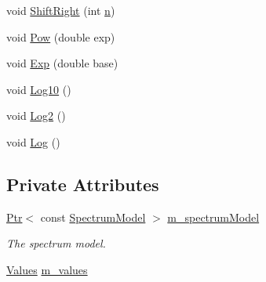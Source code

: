 \begin{DoxyCompactItemize}
\item 
void \hyperlink{classns3_1_1SpectrumValue_ac90a352a3d04720b250a9b34198a5479}{Shift\+Right} (int \hyperlink{lte__link__budget__x2__handover__measures_8m_abdb05bc5a064cf642a06c83b3392f148}{n})
\item 
void \hyperlink{classns3_1_1SpectrumValue_afd8b2f804be6e06432016e327742cea1}{Pow} (double exp)
\item 
void \hyperlink{classns3_1_1SpectrumValue_a4accdd357593a5a5b17c69b3350916c9}{Exp} (double base)
\item 
void \hyperlink{classns3_1_1SpectrumValue_afebffdf423e2b9d5c431c59cbba7bc4e}{Log10} ()
\item 
void \hyperlink{classns3_1_1SpectrumValue_aecf80550af9492df7ccefe61a6aaf349}{Log2} ()
\item 
void \hyperlink{classns3_1_1SpectrumValue_aeba3425c8eb2e31e97f700bb3ae46feb}{Log} ()
\end{DoxyCompactItemize}
\subsection*{Private Attributes}
\begin{DoxyCompactItemize}
\item 
\hyperlink{classns3_1_1Ptr}{Ptr}$<$ const \hyperlink{classns3_1_1SpectrumModel}{Spectrum\+Model} $>$ \hyperlink{classns3_1_1SpectrumValue_ab937e5d66611f1d583e631a4394d40b3}{m\+\_\+spectrum\+Model}
\begin{DoxyCompactList}\small\item\em The spectrum model. \end{DoxyCompactList}\item 
\hyperlink{namespacens3_aef171a745af083fd1fb7e4a0623d7ee5}{Values} \hyperlink{classns3_1_1SpectrumValue_a972ea01f59adf918133fb3db7af510d1}{m\+\_\+values}
\end{DoxyCompactItemize}
